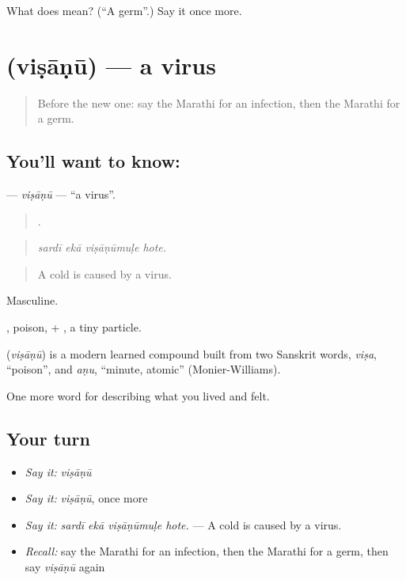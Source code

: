 \begin{tcolorbox}[breakable,colback=teal!4,colframe=teal!35!black,title={Before you move on}]
What does  mean? (\textquotedblleft{}A germ\textquotedblright{}.) Say it once more.
\end{tcolorbox}
\section[\texorpdfstring{\mr{विषाणू} (viṣāṇū)}{विषाणू (viṣāṇū)}]{ (viṣāṇū) — a virus}

\label{lesson:MR-C484-visanu}



\begin{quote}
Before the new one: say the Marathi for an infection, then the Marathi for a germ.
\end{quote}

\subsection*{You'll want to know: }
\textbf{} — \emph{viṣāṇū} — \textquotedblleft{}a virus\textquotedblright{}.

\begin{quote}
   .
\end{quote}

\begin{quote}
\emph{sardī ekā viṣāṇūmuḷe hote.}
\end{quote}

\begin{quote}
A cold is caused by a virus.
\end{quote}

Masculine.

, poison, + , a tiny particle.

\begin{cousinweb}
\textbf{} (\emph{viṣāṇū}) is a modern learned compound built from two Sanskrit words, \emph{viṣa}, \textquotedblleft{}poison\textquotedblright{}, and \emph{aṇu}, \textquotedblleft{}minute, atomic\textquotedblright{} (Monier-Williams).
\end{cousinweb}

\begin{grammarlens}[title={What you've built}]
One more word for describing what you lived and felt.
\end{grammarlens}

\subsection*{Your turn}
\begin{itemize}
\raggedright
  \item \emph{Say it:} \emph{viṣāṇū}
  \item \emph{Say it:} \emph{viṣāṇū}, once more
  \item \emph{Say it:} \emph{sardī ekā viṣāṇūmuḷe hote.} — A cold is caused by a virus.
  \item \emph{Recall:} say the Marathi for an infection, then the Marathi for a germ, then say \emph{viṣāṇū} again
\end{itemize}

